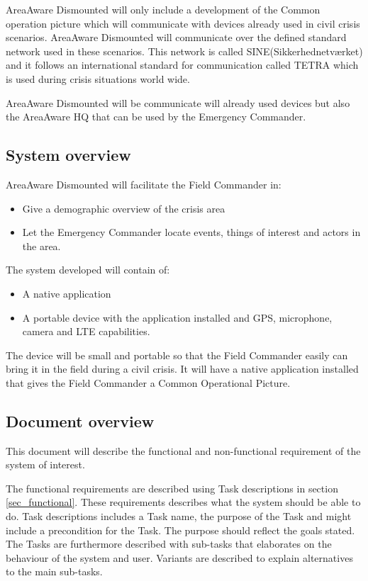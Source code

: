 AreaAware Dismounted will only include a development of the Common operation picture which will communicate with devices already used in civil crisis scenarios. AreaAware Dismounted will communicate over the defined standard network used in these scenarios. This network is called SINE(Sikkerhednetværket) and it follows an international standard for communication called TETRA which is used during crisis situations world wide. 

AreaAware Dismounted will be communicate will already used devices but also the AreaAware HQ that can be used by the Emergency Commander. 

\subsection{System overview}
AreaAware Dismounted will facilitate the Field Commander in:
\begin{itemize}
	\item Give a demographic overview of the crisis area
	\item Let the Emergency Commander locate events, things of interest and actors in the area.
\end{itemize}

The system developed will contain of:
\begin{itemize}
	\item A native application
	\item A portable device with the application installed and GPS, microphone, camera and LTE capabilities.
\end{itemize}

The device will be small and portable so that the Field Commander easily can bring it in the field during a civil crisis. It will have a native application installed that gives the Field Commander a Common Operational Picture. 


\subsection{Document overview}
\label{sec_documentOverview}
This document will describe the functional and non-functional requirement of the system of interest. 

The functional requirements are described using Task descriptions in section \ref{sec_functional}. These requirements describes what the system should be able to do. Task descriptions includes a Task name, the purpose of the Task and might include a precondition for the Task. The purpose should reflect the goals stated. The Tasks are furthermore described with sub-tasks that elaborates on the behaviour of the system and user.  Variants are described to explain alternatives to the main sub-tasks. \citep{taskDescription}

